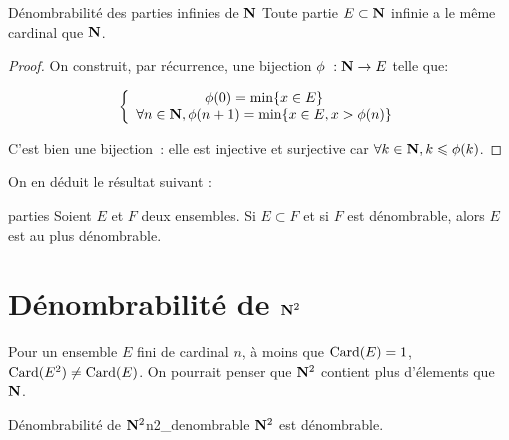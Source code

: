 \documentclass[a4paper,french,final]{memoir}
\begin{document}
\begin{theoremb}{Dénombrabilité des parties infinies de $\mathbf{N}$}{}
	Toute partie $E \subset \mathbf{N}$ infinie a le même cardinal que $\mathbf{N}$. 
\end{theoremb}

\begin{proof}
	On construit, par récurrence, une bijection $\phi~: \NN \to E$ telle que: 
	
	\[\left\lbrace \begin{array}{c}
	\phi(0) = \min \{x \in E\} \\
	\forall n \in \NN, \phi(n+1) = \min \{x \in E, x > \phi(n) \}
	\end{array} \right.\]
	
	C'est bien une bijection~: elle est injective et surjective car $\forall k \in \NN, k \leq \phi(k)$. 
\end{proof}
On en déduit le résultat suivant : 
\begin{theoremb}{}{parties}
	Soient $E$ et $F$ deux ensembles. 
	Si $E \subset F$ et si $F$ est dénombrable, alors $E$ est au plus dénombrable.
\end{theoremb}
\section{\texorpdfstring{Dénombrabilité de $\mathbf{N}^2$}{Dénombrabilité de N²}}
Pour un ensemble $E$ fini de cardinal $n$, à moins que $\operatorname{Card}(E) = 1$, $\operatorname{Card}(E^2) \neq \operatorname{Card}(E)$. On pourrait penser que $\mathbf{N}^2 $ contient plus d'élements que $\mathbf{N}$. 

\begin{theoremb}{Dénombrabilité de $\mathbf{N}^2$}{n2_denombrable}
	$\mathbf{N}^2$ est dénombrable. 
\end{theoremb}
\end{document}
